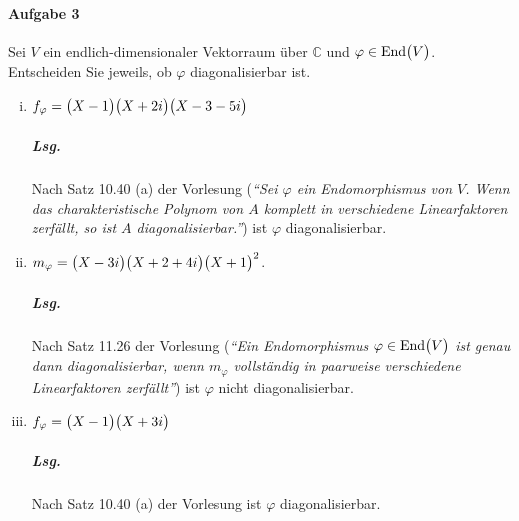 \documentclass{scrreprt}
\newcommand\End{\text{End}}
\begin{document}
\paragraph{Aufgabe 3} Sei $V$ ein endlich-dimensionaler Vektorraum über
$\mathbb{C}$ und $\varphi \in \End\qty\big(V)$.
Entscheiden Sie jeweils, ob $\varphi$ diagonalisierbar ist.

\begin{enumerate}[(i)]
\item $f_{\varphi} = \qty\big(X - 1)\qty\big(X + 2i)\qty\big(X - 3 - 5i)$

  \subparagraph{Lsg.} Nach Satz 10.40 (a) der Vorlesung (\emph{``Sei $\varphi$
    ein Endomorphismus von $V$.
    Wenn das charakteristische Polynom von $A$ komplett in verschiedene
    Linearfaktoren zerfällt, so ist $A$ diagonalisierbar.''}) ist
  $\varphi$ diagonalisierbar.

\item $m_{\varphi} = \qty\big(X - 3i)\qty\big(X + 2 + 4i)\qty\big(X + 1)^2$.

  \subparagraph{Lsg.} Nach Satz 11.26 der Vorlesung (\emph{``Ein Endomorphismus
    $\varphi \in \End\qty\big(V)$ ist genau dann diagonalisierbar, wenn
    $m_{\varphi}$ vollständig in paarweise verschiedene Linearfaktoren
    zerfällt''}) ist $\varphi$ nicht diagonalisierbar.

\item $f_{\varphi} = \qty\big(X - 1)\qty\big(X + 3i)$

  \subparagraph{Lsg.} Nach Satz 10.40 (a) der Vorlesung ist $\varphi$
  diagonalisierbar.
\end{enumerate}
\end{document}
